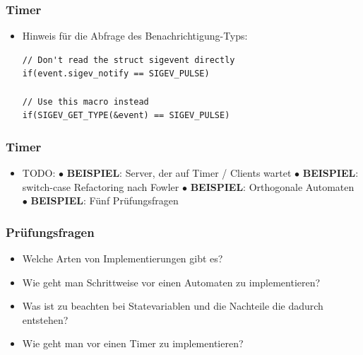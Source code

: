 \documentclass{beamer}
\begin{document}
\begin{frame}[fragile]
 \frametitle{Timer}
 \begin{itemize}
  \item Hinweis f\"ur die Abfrage des Benachrichtigung-Typs:\newline
  \begin{lstlisting}
// Don't read the struct sigevent directly
if(event.sigev_notify == SIGEV_PULSE)

// Use this macro instead
if(SIGEV_GET_TYPE(&event) == SIGEV_PULSE)
  \end{lstlisting}
 \end{itemize}
\end{frame}

\begin{frame}[fragile]
 \frametitle{Timer}
 \begin{itemize}
  \item TODO:\newline\newline
  $\bullet$ \textbf{BEISPIEL}: Server, der auf Timer / Clients wartet\newline\newline
  $\bullet$ \textbf{BEISPIEL}: switch-case Refactoring nach Fowler\newline\newline
  $\bullet$ \textbf{BEISPIEL}: Orthogonale Automaten\newline\newline
  $\bullet$ \textbf{BEISPIEL}: F\"unf Pr\"ufungsfragen
 \end{itemize}
\end{frame}

\begin{frame}
 \frametitle{Pr\"ufungsfragen}
 \begin{itemize}
  \item Welche Arten von Implementierungen gibt es?
  \item Wie geht man Schrittweise vor einen Automaten zu implementieren?
  \item Was ist zu beachten bei Statevariablen und die Nachteile die dadurch entstehen?
  \item Wie geht man vor einen Timer zu implementieren?
 \end{itemize}
\end{frame}
\end{document}
